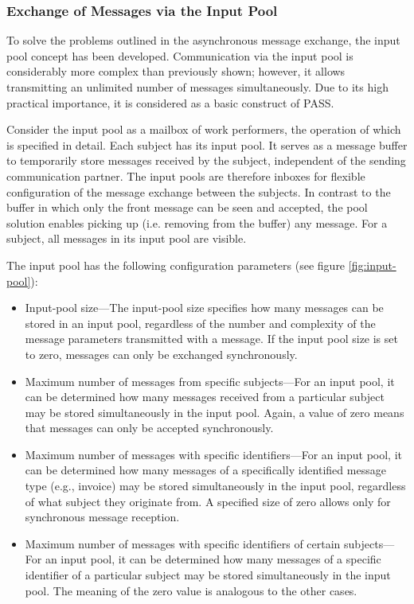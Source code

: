 \subsubsection{Exchange of Messages via the Input Pool}
\label{sec: inputpool}

To solve the problems outlined in the asynchronous message exchange, the input pool concept has been developed. Communication via the input pool is considerably more complex than previously shown; however, it allows transmitting an unlimited number of messages simultaneously. Due to its high practical importance, it is considered as a basic construct of PASS.

Consider the input pool as a mailbox of work performers, the operation of which is specified in detail. Each subject has its input pool. It serves as a message buffer to temporarily store messages received by the subject, independent of the sending communication partner. The input pools are therefore inboxes for flexible configuration of the message exchange between the subjects. In contrast to the buffer in which only the front message can be seen and accepted, the pool solution enables picking up (i.e. removing from the buffer) any message. For a subject, all messages in its input pool are visible.

The input pool has the following configuration parameters (see figure \ref{fig:input-pool}):

\begin{itemize}
	\item Input-pool size---The input-pool size specifies how many messages can be stored in an input pool, regardless of the number and complexity of the message parameters transmitted with a message. If the input pool size is set to zero, messages can only be exchanged synchronously.
	\item Maximum number of messages from specific subjects---For an input pool, it can be determined how many messages received from a particular subject may be stored simultaneously in the input pool. Again, a value of zero means that messages can only be accepted synchronously.
	\item Maximum number of messages with specific identifiers---For an input pool, it can be determined how many messages of a specifically identified message type (e.g., invoice) may be stored simultaneously in the input pool, regardless of what subject they originate from. A specified size of zero allows only for synchronous message reception.
	\item Maximum number of messages with specific identifiers of certain subjects---For an input pool, it can be determined how many messages of a specific identifier of a particular subject may be stored simultaneously in the input pool. The meaning of the zero value is analogous to the other cases.
\end{itemize}

